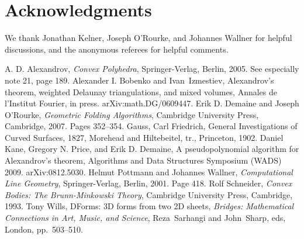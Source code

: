 \documentclass{article}
\begin{document}
\section{Acknowledgments}
We thank Jonathan Kelner, Joseph O'Rourke, and Johannes Wallner for
helpful discussions, and the anonymous referees for helpful comments.




\begin{thebibliography}{PW01}
A. D. Alexandrov,  {\sl Convex Polyhedra},
  Springer-Verlag, Berlin, 2005.  See especially note 21, page 189.
Alexander I. Bobenko and Ivan~Izmestiev, Alexandrov's
  theorem, weighted Delaunay triangulations, and mixed volumes,
  Annales de l'Institut Fourier, in press. {\rm arXiv:math.DG/0609447}.
Erik D. Demaine and Joseph O'Rourke, {\sl
    Geometric Folding Algorithms}, Cambridge University Press,
  Cambridge, 2007.  Pages 352--354.
Gauss, Carl Friedrich, General Investigations of
  Curved Surfaces, 1827, Morehead and Hiltebeitel, tr., Princeton, 1902.
Daniel Kane, Gregory N. Price, and Erik
  D. Demaine, A pseudopolynomial algorithm for Alexandrov's theorem,
  Algorithms and Data Structures Symposium (WADS) 2009.  {\rm arXiv:0812.5030}.
Helmut Pottmann and Johannes Wallner, {\sl
    Computational Line Geometry}, Springer-Verlag, Berlin, 2001.  Page
  418.
Rolf Schneider, {\sl Convex Bodies: The
    Brunn-Minkowski Theory}, Cambridge University Press, Cambridge,
  1993.
Tony Wills, DForms: 3D forms from two 2D sheets,
  {\sl Bridges: Mathematical Connections in Art, Music, and Science},
  Reza~Sarhangi and John~Sharp, eds, London, pp.~503--510.
\end{thebibliography}
\end{document}
